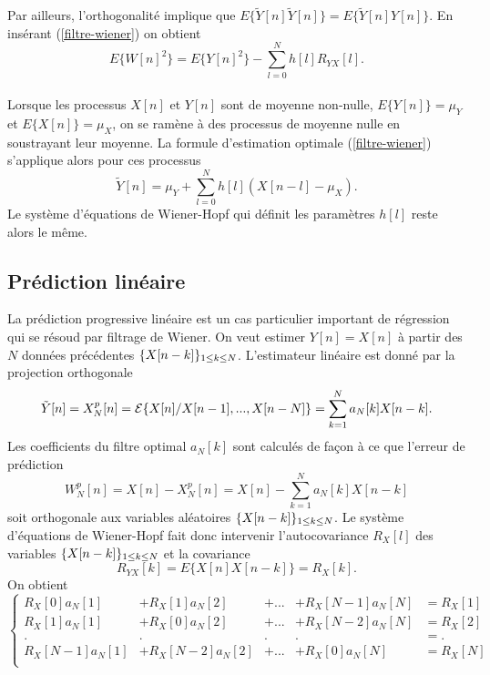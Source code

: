 Par ailleurs, l'orthogonalit\'e implique que 
$E\{\tilde Y[n] \tilde Y[n]\} = E\{ \tilde Y[n] Y[n]\}$.
En ins\'erant (\ref{filtre-wiener}) on obtient
\begin{equation}
\label{erreur-reg}
E\{W [n]^2\} = E\{Y [n]^2\}  - 
\sum_{l=0}^{N} h[l] R_{YX} [l] .
\end{equation}
\\
Lorsque les processus $X[n]$ et $Y[n]$ sont de moyenne non-nulle,
$E\{Y[n]\} = \mu_Y$ et $E\{X[n]\} = \mu_X$,
on se ram\`ene \`a des processus de moyenne nulle en soustrayant
leur moyenne. La formule d'estimation optimale 
(\ref{filtre-wiener}) s'applique alors pour ces processus 
\[
\tilde Y[n] = \mu_Y +  \sum_{l=0}^{N} h[l] (X[n-l] - \mu_X) .
\]
Le syst\`eme d'\'equations de Wiener-Hopf qui d\'efinit
les param\`etres $h[l]$ reste alors le m\^eme.


\subsection{Pr\'ediction lin\'eaire}
\label{predict-lin-se}

La pr\'ediction progressive lin\'eaire
est un cas particulier important de r\'egression
qui se r\'esoud par filtrage de Wiener.
On veut estimer $Y[n]= X[n]$ \`a partir des $N$ 
donn\'ees pr\'ec\'edentes
$\{X[n-k]\}_{ 1 \leq k \leq N}$.
L'estimateur lin\'eaire est donn\'e par la projection orthogonale
\begin{equation}
\label{est_prog}
\tilde Y[n] = X^p_N [n]
= {\cal E} \{ X[n] {/} X[n-1] , ..., X[n-N] \} = 
\sum_{k=1}^N a_N [k] X[n-k] .
\end{equation}
Les coefficients du filtre optimal $a_N[k]$ sont calcul\'es
de fa\c{c}on \`a ce que l'erreur de pr\'ediction
\begin{equation}
\label{error_formula}
W^p_N [n] = X[n] - X^p_N [n] = X[n] - \sum_{k=1}^N a_N [k] X[n-k] 
\end{equation}
soit orthogonale aux variables al\'eatoires 
$\{X[n-k]\}_{ 1 \leq k \leq N}$.
Le syst\`eme d'\'equations de Wiener-Hopf fait donc
intervenir l'autocovariance $R_X[l]$ des variables
$\{X[n-k]\}_{ 1 \leq k \leq N}$ et la covariance
\[
R_{YX} [k ] = E\{ X[n] X[n-k]\} = R_X[k] .
\]
On obtient
\begin{equation}
\label{WH_pred}
\left\{
\begin{array}{ccccl}
R_X[0]  a_N[1] & + R_X[1] a_N [2] &+  ...& + R_X[N-1] a_N [N] & = R_X[1]\\
R_X[1]  a_N[1] & + R_X[0] a_N [2] &+  ...& + R_X[N-2] a_N [N] & = R_X[2]\\
. & . & . & . & = . \\
R_X[N-1]  a_N[1] & + R_X[N-2] a_N [2] &+ ... & +  R_X[0] a_N [N] & = R_X[N]\\
\end{array}
\right.
\end{equation}

